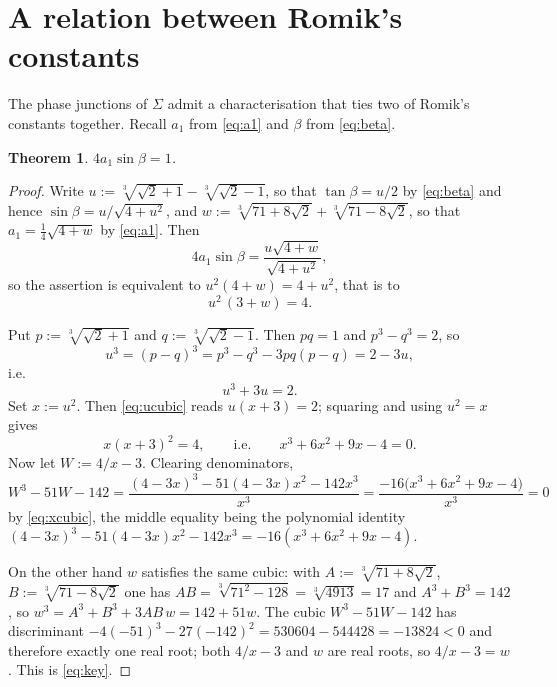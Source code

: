\documentclass[11pt]{article}
\newtheorem{theorem}{Theorem}
\theoremstyle{definition}
\newcommand{\Sig}{\Sigma}
\begin{document}
\section{A relation between Romik's constants}\label{sec:cubics}

The phase junctions of $\Sig$ admit a characterisation that ties two of Romik's
constants together. Recall $a_1$ from \eqref{eq:a1} and $\beta$ from
\eqref{eq:beta}.

\begin{theorem}\label{thm:a1beta}
$4a_1\sin\beta=1$.
\end{theorem}

\begin{proof}
Write $u:=\sqrt[3]{\sqrt2+1}-\sqrt[3]{\sqrt2-1}$, so that $\tan\beta=u/2$ by
\eqref{eq:beta} and hence $\sin\beta=u/\sqrt{4+u^{2}}$, and
$w:=\sqrt[3]{71+8\sqrt2}+\sqrt[3]{71-8\sqrt2}$, so that $a_1=\tfrac14\sqrt{4+w}$
by \eqref{eq:a1}. Then
\[
  4a_1\sin\beta=\frac{u\sqrt{4+w}}{\sqrt{4+u^{2}}},
\]
so the assertion is equivalent to $u^{2}(4+w)=4+u^{2}$, that is to
\begin{equation}\label{eq:key}
  u^{2}\,(3+w)=4 .
\end{equation}

Put $p:=\sqrt[3]{\sqrt2+1}$ and $q:=\sqrt[3]{\sqrt2-1}$. Then $pq=1$ and
$p^{3}-q^{3}=2$, so
\[
  u^{3}=(p-q)^{3}=p^{3}-q^{3}-3pq(p-q)=2-3u,
\]
i.e.
\begin{equation}\label{eq:ucubic}
  u^{3}+3u=2 .
\end{equation}
Set $x:=u^{2}$. Then \eqref{eq:ucubic} reads $u(x+3)=2$; squaring and using
$u^{2}=x$ gives
\begin{equation}\label{eq:xcubic}
  x(x+3)^{2}=4,\qquad\text{i.e.}\qquad x^{3}+6x^{2}+9x-4=0 .
\end{equation}
Now let $W:=4/x-3$. Clearing denominators,
\[
  W^{3}-51W-142
   =\frac{(4-3x)^{3}-51(4-3x)x^{2}-142x^{3}}{x^{3}}
   =\frac{-16\bigl(x^{3}+6x^{2}+9x-4\bigr)}{x^{3}}=0
\]
by \eqref{eq:xcubic}, the middle equality being the polynomial identity
$(4-3x)^{3}-51(4-3x)x^{2}-142x^{3}=-16(x^{3}+6x^{2}+9x-4)$.

On the other hand $w$ satisfies the same cubic: with
$A:=\sqrt[3]{71+8\sqrt2}$, $B:=\sqrt[3]{71-8\sqrt2}$ one has
$AB=\sqrt[3]{71^{2}-128}=\sqrt[3]{4913}=17$ and $A^{3}+B^{3}=142$, so
$w^{3}=A^{3}+B^{3}+3AB\,w=142+51w$. The cubic $W^{3}-51W-142$ has discriminant
$-4(-51)^{3}-27(-142)^{2}=530604-544428=-13824<0$ and therefore exactly one real
root; both $4/x-3$ and $w$ are real roots, so $4/x-3=w$. This is
\eqref{eq:key}.
\end{proof}
\end{document}
